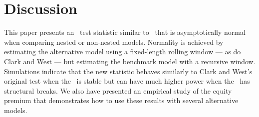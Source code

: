 \section{Discussion}\label{sec:4}
This paper presents an \oos\ test statistic similar to \poscw\ that is
asymptotically normal when comparing nested or non-nested models.
Normality is achieved by estimating the alternative model using a
fixed-length rolling window --- as do Clark and West --- but
estimating the benchmark model with a recursive window.  Simulations
indicate that the new statistic behaves similarly to Clark and West's
original test when the \dgp\ is stable but can have much higher power
when the \dgp\ has structural breaks. We also have presented an
empirical study of the equity premium that demonstrates how to use
these results with several alternative models.

